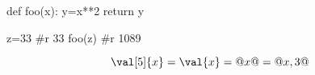 \documentclass{article}
\begin{document}
\begin{calc}
def foo(x):
	y=x**2
	return y

z=33
#r 33
foo(z)
#r 1089
\end{calc}


$$
\val[5]{x} =
\val{x} =
@x@ = 
@x,3@ $$
\end{document}
